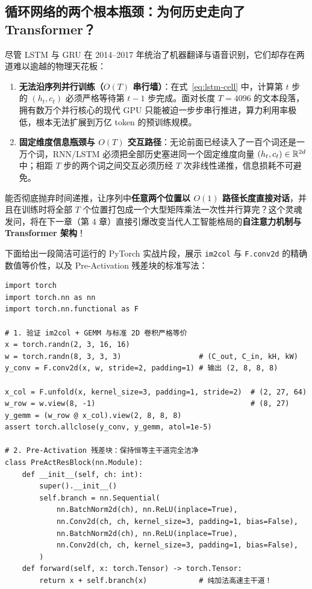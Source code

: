 \subsection{循环网络的两个根本瓶颈：为何历史走向了 Transformer？}

尽管 LSTM 与 GRU 在 2014--2017 年统治了机器翻译与语音识别，它们却存在两道难以逾越的物理天花板：
\begin{enumerate}
  \item \textbf{无法沿序列并行训练（$O(T)$ 串行墙）}：在式~\eqref{eq:lstm-cell} 中，计算第 $t$ 步的 $(h_t, c_t)$ 必须严格等待第 $t-1$ 步完成。面对长度 $T = 4096$ 的文本段落，拥有数万个并行核心的现代 GPU 只能被迫一步步串行推进，算力利用率极低，根本无法扩展到万亿 token 的预训练规模。
  \item \textbf{固定维度信息瓶颈与 $O(T)$ 交互路径}：无论前面已经读入了一百个词还是一万个词，RNN/LSTM 必须把全部历史塞进同一个固定维度向量 $(h_t, c_t) \in \mathbb{R}^{2d}$ 中；相距 $T$ 步的两个词之间交互必须历经 $T$ 次非线性递推，信息损耗不可避免。
\end{enumerate}

能否彻底抛弃时间递推，让序列中\textbf{任意两个位置以 $O(1)$ 路径长度直接对话}，并且在训练时将全部 $T$ 个位置打包成一个大型矩阵乘法一次性并行算完？这个灵魂发问，将在下一章（第 4 章）直接引爆改变当代人工智能格局的\textbf{自注意力机制与 Transformer 架构}！

下面给出一段简洁可运行的 PyTorch 实战片段，展示 \texttt{im2col} 与 \texttt{F.conv2d} 的精确数值等价性，以及 Pre-Activation 残差块的标准写法：

\begin{lstlisting}[caption={\texttt{im2col}（\texttt{F.unfold}）与 \texttt{F.conv2d} 数值等价验证及 Pre-Act 残差块}]
import torch
import torch.nn as nn
import torch.nn.functional as F

# 1. 验证 im2col + GEMM 与标准 2D 卷积严格等价
x = torch.randn(2, 3, 16, 16)
w = torch.randn(8, 3, 3, 3)                  # (C_out, C_in, kH, kW)
y_conv = F.conv2d(x, w, stride=2, padding=1) # 输出 (2, 8, 8, 8)

x_col = F.unfold(x, kernel_size=3, padding=1, stride=2)  # (2, 27, 64)
w_row = w.view(8, -1)                                    # (8, 27)
y_gemm = (w_row @ x_col).view(2, 8, 8, 8)
assert torch.allclose(y_conv, y_gemm, atol=1e-5)

# 2. Pre-Activation 残差块：保持恒等主干道完全洁净
class PreActResBlock(nn.Module):
    def __init__(self, ch: int):
        super().__init__()
        self.branch = nn.Sequential(
            nn.BatchNorm2d(ch), nn.ReLU(inplace=True),
            nn.Conv2d(ch, ch, kernel_size=3, padding=1, bias=False),
            nn.BatchNorm2d(ch), nn.ReLU(inplace=True),
            nn.Conv2d(ch, ch, kernel_size=3, padding=1, bias=False),
        )
    def forward(self, x: torch.Tensor) -> torch.Tensor:
        return x + self.branch(x)            # 纯加法高速主干道！
\end{lstlisting}

